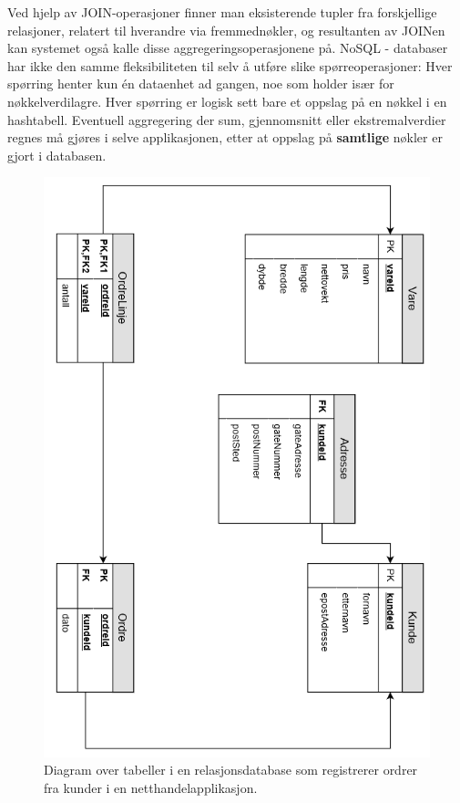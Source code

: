 Ved hjelp av JOIN-operasjoner finner man eksisterende tupler fra forskjellige relasjoner, relatert til hverandre via fremmednøkler, og resultanten av JOINen kan systemet også kalle disse aggregeringsoperasjonene på. NoSQL - databaser har ikke den samme fleksibiliteten til selv å utføre slike spørreoperasjoner: Hver spørring henter kun én dataenhet ad gangen, noe som holder især for nøkkelverdilagre. Hver spørring er logisk sett bare et oppslag på en nøkkel i en hashtabell. Eventuell aggregering der sum, gjennomsnitt eller ekstremalverdier regnes må gjøres i selve applikasjonen, etter at oppslag på \textbf{samtlige} nøkler er gjort i databasen.

\begin{figure}[!ht]
    \centering
    \includegraphics[scale=0.7]{fig/NettbutikkOrdreModell.png}
    \caption{Diagram over tabeller i en relasjonsdatabase som registrerer ordrer fra kunder i en netthandelapplikasjon.}
    \label{fig1}
\end{figure}
 
